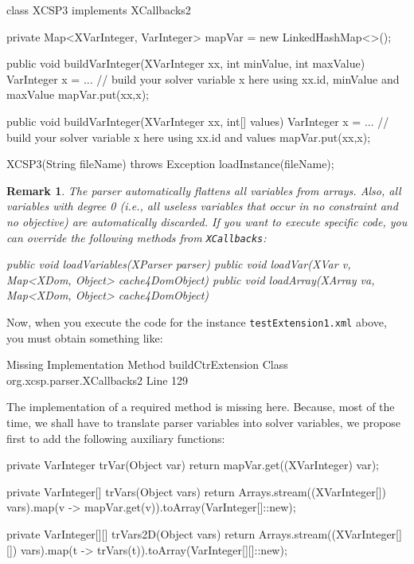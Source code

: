 \documentclass[10pt]{article}
\newenvironment{boxabsc}
               {\medskip \begin{bclogo}[barre=none,arrondi=0.2,logo=]{}\vspace{-0.6cm}}
               {\vspace{-0.1cm}\end{bclogo} \smallskip}
\newtheorem{remark}{Remark}
\newcommand{\nn}[1]{{\tt #1}} %
\begin{document}
\begin{boxabsc}
\begin{absc}
class XCSP3 implements XCallbacks2 { 
  private Map<XVarInteger, VarInteger> mapVar = new LinkedHashMap<>();

  public void buildVarInteger(XVarInteger xx, int minValue, int maxValue) {
    VarInteger x = ...  // build your solver variable x here using xx.id, minValue and maxValue
    mapVar.put(xx,x);  
  }

  public void buildVarInteger(XVarInteger xx, int[] values) { 
    VarInteger x = ... // build your solver variable x here using xx.id and values
    mapVar.put(xx,x);  
  }
  
  XCSP3(String fileName) throws Exception {
    loadInstance(fileName); 
  }
}
\end{absc} 
\end{boxabsc}


\begin{remark}
The parser automatically flattens all variables from arrays. Also, all variables with degree 0 (i.e., all useless variables that occur in no constraint and no objective) are automatically discarded. 
If you want to execute specific code, you can override the following methods from \nn{XCallbacks}:
\begin{absc}
  public void loadVariables(XParser parser) 
  public void loadVar(XVar v, Map<XDom, Object> cache4DomObject)
  public void loadArray(XArray va, Map<XDom, Object> cache4DomObject) 
\end{absc} 
\end{remark}

Now, when you execute the code for the instance \nn{testExtension1.xml} above, you must obtain something like:

\begin{boxabsc}
\begin{absc}
Missing Implementation
  Method buildCtrExtension
  Class org.xcsp.parser.XCallbacks2
  Line 129
\end{absc} 
\end{boxabsc}
 
The implementation of a required method is missing here. Because, most of the time, we shall have to translate parser variables into solver variables, we propose first to add the following auxiliary functions:

\begin{boxabsc}
\begin{absc}
  private VarInteger trVar(Object var) {
    return mapVar.get((XVarInteger) var);
  }
  
  private VarInteger[] trVars(Object vars) {
    return Arrays.stream((XVarInteger[]) vars).map(v -> mapVar.get(v)).toArray(VarInteger[]::new);
  }
  
  private VarInteger[][] trVars2D(Object vars) {
    return Arrays.stream((XVarInteger[][]) vars).map(t -> trVars(t)).toArray(VarInteger[][]::new);
  }
\end{absc} 
\end{boxabsc}
\end{document}
